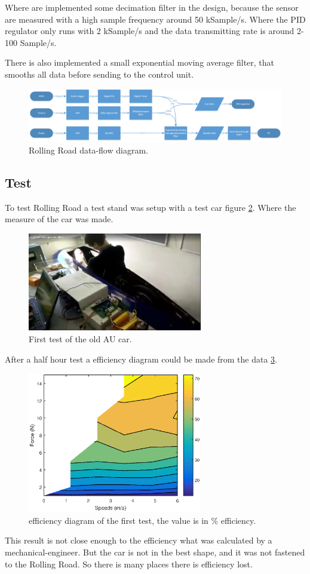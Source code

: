  Where are implemented some decimation filter in the design, because the sensor are measured with a high sample frequency around 50 kSample/s. Where the PID regulator only runs with 2 kSample/s and the data transmitting rate is around 2-100 Sample/s.
 
There is also implemented a small exponential moving average filter, that smooths all data before sending to the control unit.    

\begin{figure}[H]
	\centering
	\includegraphics [width=6in]{../Documentation_RR/Software/Pictures/data-flow.png}
	\caption{Rolling Road data-flow diagram.}
	\label{fig:data_flow_diagram}
\end{figure}
\subsection{Test}
To test Rolling Road a test stand was setup with a test car figure \ref{fig:RR_first_test}. Where the measure of the car was made. 
\begin{figure}[H]
	\centering
	\includegraphics [width=3in]{SubPages/Images/jens_test.png}
	\caption{First test of the old AU car.}
	\label{fig:RR_first_test}
\end{figure}
After a half hour test a efficiency diagram could be made from the data \ref{fig:RR_first_test_result}.

\begin{figure}[H] 
	\centering
	\includegraphics [width=3in]{SubPages/Images/RR_test_result.eps}
	\caption{efficiency diagram of the first test, the value is in \% efficiency.}
	\label{fig:RR_first_test_result}
\end{figure}
This result is not close enough to the efficiency what was calculated by a mechanical-engineer. But the car is not in the best shape, and it was not fastened to the Rolling Road. So there is many places there is efficiency lost.


